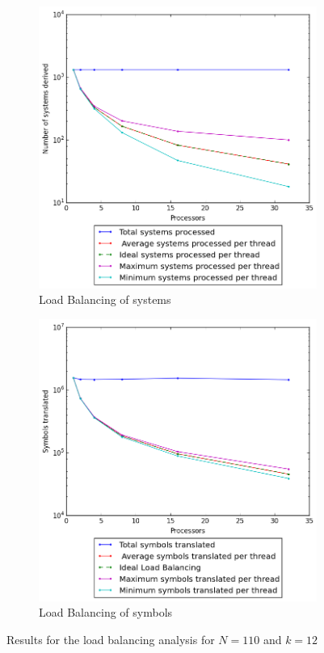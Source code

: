 \documentclass[letterpaper,twoside,11pt]{article}
\begin{document}
\begin{multicols}{2}
\begin{figure}
  \centering
  \begin{subfigure}{.5\textwidth}
    \centering
    \includegraphics[width=.99\textwidth]{../3 Analysis/Load/systemsnaive110.png}
    \caption{Load Balancing of systems}
    \label{fig:Load_systems}
  \end{subfigure}%
  \begin{subfigure}{.5\textwidth}
    \centering
    \includegraphics[width=.99\textwidth]{../3 Analysis/Load/symbolsnaive110.png}
    \caption{Load Balancing of symbols}
    \label{fig:Load_symbols}
  \end{subfigure}
  \caption{Results for the load balancing analysis for $N = 110$ and $k = 12$}
\end{figure}


\end{multicols}
\end{document}
